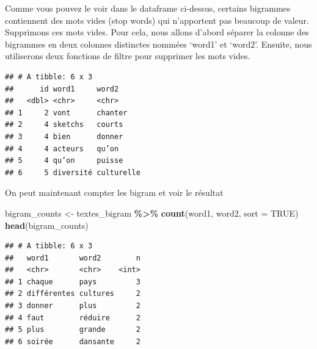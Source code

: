 \documentclass[
]{article}
\newenvironment{Shaded}{\begin{snugshade}}{\end{snugshade}}
\newcommand{\AttributeTok}[1]{\textcolor[rgb]{0.13,0.29,0.53}{#1}}
\newcommand{\CommentTok}[1]{\textcolor[rgb]{0.56,0.35,0.01}{\textit{#1}}}
\newcommand{\ConstantTok}[1]{\textcolor[rgb]{0.56,0.35,0.01}{#1}}
\newcommand{\FunctionTok}[1]{\textcolor[rgb]{0.13,0.29,0.53}{\textbf{#1}}}
\newcommand{\NormalTok}[1]{#1}
\newcommand{\OtherTok}[1]{\textcolor[rgb]{0.56,0.35,0.01}{#1}}
\newcommand{\SpecialCharTok}[1]{\textcolor[rgb]{0.81,0.36,0.00}{\textbf{#1}}}
\newcommand{\StringTok}[1]{\textcolor[rgb]{0.31,0.60,0.02}{#1}}
\begin{document}
Comme vous pouvez le voir dans le dataframe ci-dessus, certains
bigrammes contiennent des mots vides (stop words) qui n'apportent pas
beaucoup de valeur. Supprimons ces mots vides. Pour cela, nous allons
d'abord séparer la colonne des bigrammes en deux colonnes distinctes
nommées `word1' et `word2'. Ensuite, nous utiliserons deux fonctions de
filtre pour supprimer les mots vides.

\begin{Shaded}
\end{Shaded}

\begin{verbatim}
## # A tibble: 6 x 3
##      id word1     word2     
##   <dbl> <chr>     <chr>     
## 1     2 vont      chanter   
## 2     4 sketchs   courts    
## 3     4 bien      donner    
## 4     4 acteurs   qu’on     
## 5     4 qu’on     puisse    
## 6     5 diversité culturelle
\end{verbatim}

On peut maintenant compter les bigram et voir le résultat

\begin{Shaded}
\begin{Highlighting}[]
\NormalTok{bigram\_counts }\OtherTok{\textless{}{-}}\NormalTok{ textes\_bigram }\SpecialCharTok{\%\textgreater{}\%}
  \FunctionTok{count}\NormalTok{(word1, word2, }\AttributeTok{sort =} \ConstantTok{TRUE}\NormalTok{)}
\FunctionTok{head}\NormalTok{(bigram\_counts)}
\end{Highlighting}
\end{Shaded}

\begin{verbatim}
## # A tibble: 6 x 3
##   word1       word2        n
##   <chr>       <chr>    <int>
## 1 chaque      pays         3
## 2 différentes cultures     2
## 3 donner      plus         2
## 4 faut        réduire      2
## 5 plus        grande       2
## 6 soirée      dansante     2
\end{verbatim}
\end{document}
